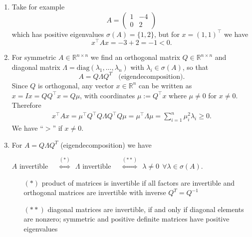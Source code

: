 {
\color{solution}
\begin{enumerate}
	\item Take for example 
	$$A=\begin{pmatrix}
	1&-4\\
	0&2
	\end{pmatrix} $$
	which has positive eigenvalues $\sigma(A)=\{1,2\}$, but for $x=(1,1)^\top$ we have
		$$x^\top A x = -3+2 = -1 < 0. $$
	\item 	For symmetric $A\in\mathbb{R}^{n\times n}$ we find an orthogonal matrix $Q\in\mathbb{R}^{n\times n}$ and diagonal matrix $\Lambda = \text{diag}(\lambda_1,\ldots,\lambda_n)$ with $\lambda_i\in\sigma(A)$, so that   $$A=Q\Lambda Q^T ~~~~\text{(eigendecomposition)}.$$
	Since $Q$ is orthogonal, any vector $x \in \mathbb{R}^n$ can be written as $x = Ix=QQ^\top x=Q\mu$, with coordinates $\mu := Q^\top x$ where $\mu \neq 0$ for $x\neq 0$. Therefore 
	\begin{equation*}
	\begin{aligned}
	x^\top A x = \mu^\top Q^\top Q\Lambda Q^\top Q \mu = \mu^\top \Lambda \mu = \sum_{i=1}^n \mu_i^2 \lambda_i \geq 0.
	\end{aligned}
	\end{equation*}
	We have ``$>$'' if $x \neq 0$.
	\item 
	For $A=Q\Lambda Q^T$ (eigendecomposition) we have 
		\begin{center}
		$A$ invertible 
		~~$\stackrel{(*)}{\Leftrightarrow}\ \ \Lambda$ invertible 
		~~$\stackrel{(**)}{\Leftrightarrow}\ \ \lambda\neq 0\ \ \forall\lambda\in\sigma(A)$.
	\end{center}
	\begin{itemize}
		\item[$(*)$]  product of matrices is invertible if all factors are invertible and orthogonal matrices are invertible with inverse $Q^T=Q^{-1}$
		\item[$(**)$] diagonal matrices are invertible, if and only if diagonal elements are nonzero; symmetric and positive definite matrices have positive eigenvalues
	\end{itemize}
\end{enumerate}
}